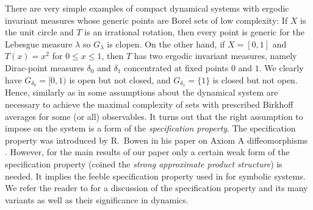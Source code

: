 \documentclass{amsart}
\theoremstyle{definition}
\newcommand{\base}{r}
\newcommand{\nor}{\mathcal{N}}
\begin{document}






















There are very simple examples of compact dynamical systems with ergodic invariant measures whose generic points are Borel sets of low complexity:
If $X$ is the unit circle and $T$ is an irrational rotation, then every point is generic for the Lebesgue measure $\lambda$ so $G_\lambda$ is clopen. On the other hand, if $X=[0,1]$ and $T(x)=x^2$ for $0\le x \le 1$, then $T$ has two ergodic invariant measures, namely Dirac-point measures $\delta_0$ and $\delta_1$ concentrated at fixed points $0$ and $1$. We clearly have
$G_{\delta_0}=[0,1)$ is open but not closed, and $G_{\delta_1}=\{1\}$ is closed but not open. Hence, similarly as in \cite{AJKM} some assumptions about the dynamical system are necessary to achieve the maximal complexity of sets with prescribed Birkhoff averages for some (or all) observables.
It turns out that the right assumption to
impose on the system is a form of the {\em specification property}.
The specification property was introduced by R.\ Bowen in his
paper on Axiom A diffeomorphisms \cite{BowenAxiomA}. However, for the main results of our paper
only a certain weak form of the specification property (coined the \emph{strong approximate product structure}) is needed.
It implies the feeble specification property used in \cite{AJKM} for symbolic systems.
We refer the reader to \cite{KLO} for a discussion of the specification property
and its many variants as well as their significance in dynamics.
\end{document}
